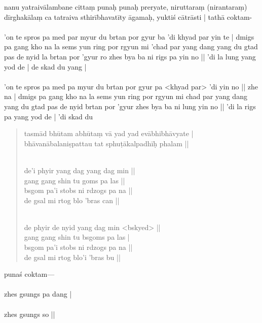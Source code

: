 \documentclass[12pt]{article}
\begin{document}
nanu yatraivālambane cittaṃ punaḥ punaḥ preryate, niruttaraṃ (nirantaraṃ) dīrghakālaṃ ca tatraiva sthirībhavatīty āgamaḥ, yuktiś cātrāsti | tathā coktam-\\

\textbf{\TVA}\\
'on te spros pa med par myur du brtan por gyur ba 'di khyad par yin te | dmigs pa gang kho na la sems yun ring por rgyun mi 'chad par yang dang yang du gtad pas de nyid la brtan por 'gyur ro zhes bya ba ni rigs pa yin no || 'di la lung yang yod de | de skad du yang |\\

\textbf{\TVB}\\
'on te spros pa med pa myur du brtan por gyur pa <khyad par> 'di yin no || zhe na | dmigs pa gang kho na la sems yun ring por rgyun mi chad par yang dang yang du gtad pas de nyid brtan por 'gyur zhes bya ba ni lung yin no || 'di la rigs pa yang yod de | 'di skad du 

\begin{quote}
	tasmād bhūtam abhūtaṃ vā yad yad evābhibhāvyate | \\
	bhāvanābalaniṣpattau tat sphuṭākalpadhīḥ phalam ||

	\textbf{\TVA}\\
	de'i phyir yang dag yang dag min || \\
	gang gang shin tu goms pa las || \\
	bsgom pa'i stobs ni rdzogs pa na || \\
	de gsal mi rtog blo 'bras can || 

	\textbf{\TVB}\\
	de phyir de nyid yang dag min <bskyed> || \\
	gang gang shin tu bsgoms pa las | \\
	bsgom pa'i stobs ni rdzogs pa na || \\
	de gsal mi rtog blo'i 'bras bu || 
\end{quote}

punaś coktam—\\

\textbf{\TVA}\\
zhes gsungs pa dang |\\

\textbf{\TVB}\\
zhes gsungs so ||\\
\end{document}
